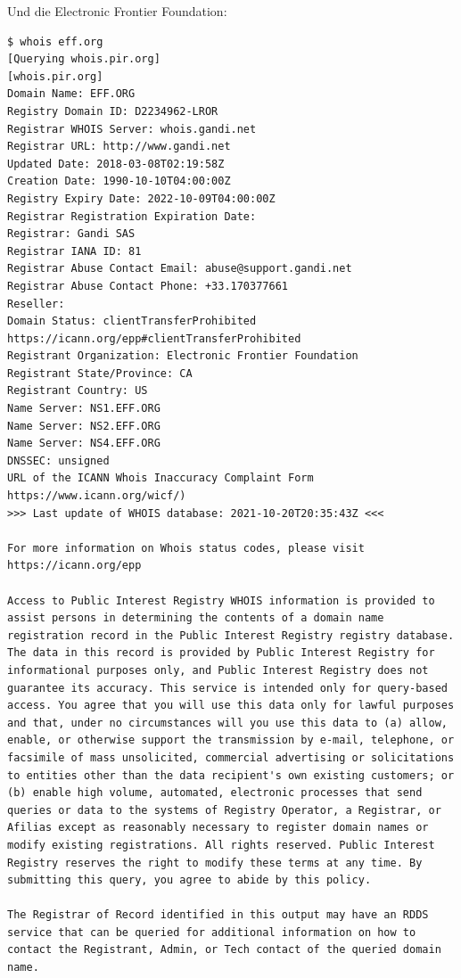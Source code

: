 Und die Electronic Frontier Foundation:

\begin{verbatim}
$ whois eff.org
[Querying whois.pir.org]
[whois.pir.org]
Domain Name: EFF.ORG
Registry Domain ID: D2234962-LROR
Registrar WHOIS Server: whois.gandi.net
Registrar URL: http://www.gandi.net
Updated Date: 2018-03-08T02:19:58Z
Creation Date: 1990-10-10T04:00:00Z
Registry Expiry Date: 2022-10-09T04:00:00Z
Registrar Registration Expiration Date:
Registrar: Gandi SAS
Registrar IANA ID: 81
Registrar Abuse Contact Email: abuse@support.gandi.net
Registrar Abuse Contact Phone: +33.170377661
Reseller:
Domain Status: clientTransferProhibited https://icann.org/epp#clientTransferProhibited
Registrant Organization: Electronic Frontier Foundation
Registrant State/Province: CA
Registrant Country: US
Name Server: NS1.EFF.ORG
Name Server: NS2.EFF.ORG
Name Server: NS4.EFF.ORG
DNSSEC: unsigned
URL of the ICANN Whois Inaccuracy Complaint Form https://www.icann.org/wicf/)
>>> Last update of WHOIS database: 2021-10-20T20:35:43Z <<<

For more information on Whois status codes, please visit https://icann.org/epp

Access to Public Interest Registry WHOIS information is provided to assist persons in determining the contents of a domain name registration record in the Public Interest Registry registry database. The data in this record is provided by Public Interest Registry for informational purposes only, and Public Interest Registry does not guarantee its accuracy. This service is intended only for query-based access. You agree that you will use this data only for lawful purposes and that, under no circumstances will you use this data to (a) allow, enable, or otherwise support the transmission by e-mail, telephone, or facsimile of mass unsolicited, commercial advertising or solicitations to entities other than the data recipient's own existing customers; or (b) enable high volume, automated, electronic processes that send queries or data to the systems of Registry Operator, a Registrar, or Afilias except as reasonably necessary to register domain names or modify existing registrations. All rights reserved. Public Interest Registry reserves the right to modify these terms at any time. By submitting this query, you agree to abide by this policy.

The Registrar of Record identified in this output may have an RDDS service that can be queried for additional information on how to contact the Registrant, Admin, or Tech contact of the queried domain name.
\end{verbatim}

